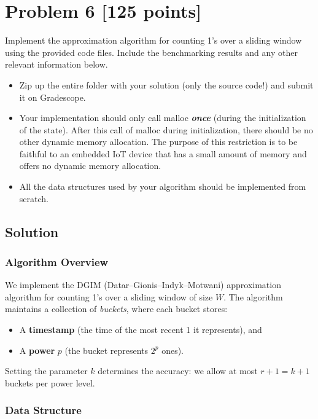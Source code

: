 \documentclass[11pt]{article}
\begin{document}
\newpage
\section*{Problem 6 [125 points]}

Implement the approximation algorithm for counting 1's over a sliding window using the provided code files. Include the benchmarking results and any other relevant information below.
\begin{itemize}[$-$]
\item
Zip up the entire folder with your solution (only the source code!) and submit it on Gradescope.
\item
Your implementation should only call malloc \textbf{\em once} (during the initialization of the state). After this call of malloc during initialization, there should be no other dynamic memory allocation. The purpose of this restriction is to be faithful to an embedded IoT device that has a small amount of memory and offers no dynamic memory allocation.
\item
All the data structures used by your algorithm should be implemented from scratch.
\end{itemize}

\subsection*{Solution}

\subsubsection*{Algorithm Overview}

We implement the DGIM (Datar--Gionis--Indyk--Motwani) approximation algorithm for counting 1's over a sliding window of size $W$. The algorithm maintains a collection of \emph{buckets}, where each bucket stores:
\begin{itemize}
\item A \textbf{timestamp} (the time of the most recent 1 it represents), and
\item A \textbf{power} $p$ (the bucket represents $2^p$ ones).
\end{itemize}

\noindent
Setting the parameter $k$ determines the accuracy: we allow at most $r + 1 = k + 1$ buckets per power level.

\subsubsection*{Data Structure}
\end{document}
